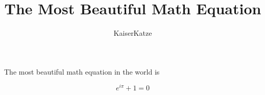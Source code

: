 \documentclass[12pt]{article}
\title{The Most Beautiful Math Equation}
\author{KaiserKatze}
\begin{document}
The most beautiful math equation in the world is

$$ e^{i \pi} + 1 = 0 $$
\end{document}

